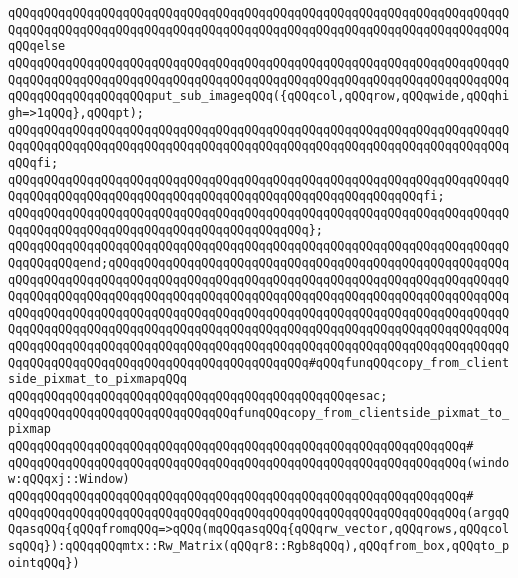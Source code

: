 \verb|qQQqqQQqqQQqqQQqqQQqqQQqqQQqqQQqqQQqqQQqqQQqqQQqqQQqqQQqqQQqqQQqqQQqqQQqqQQqqQQqqQQqqQQqqQQqqQQqqQQqqQQqqQQqqQQqqQQqqQQqqQQqqQQqqQQqqQQqqQQqqQQqelse|\newline
\verb|qQQqqQQqqQQqqQQqqQQqqQQqqQQqqQQqqQQqqQQqqQQqqQQqqQQqqQQqqQQqqQQqqQQqqQQqqQQqqQQqqQQqqQQqqQQqqQQqqQQqqQQqqQQqqQQqqQQqqQQqqQQqqQQqqQQqqQQqqQQqqQQqqQQqqQQqqQQqqQQqput_sub_imageqQQq({qQQqcol,qQQqrow,qQQqwide,qQQqhigh=>1qQQq},qQQqpt);|\newline
\verb|qQQqqQQqqQQqqQQqqQQqqQQqqQQqqQQqqQQqqQQqqQQqqQQqqQQqqQQqqQQqqQQqqQQqqQQqqQQqqQQqqQQqqQQqqQQqqQQqqQQqqQQqqQQqqQQqqQQqqQQqqQQqqQQqqQQqqQQqqQQqqQQqfi;|\newline
\verb|qQQqqQQqqQQqqQQqqQQqqQQqqQQqqQQqqQQqqQQqqQQqqQQqqQQqqQQqqQQqqQQqqQQqqQQqqQQqqQQqqQQqqQQqqQQqqQQqqQQqqQQqqQQqqQQqqQQqqQQqqQQqqQQqfi;|\newline
\verb|qQQqqQQqqQQqqQQqqQQqqQQqqQQqqQQqqQQqqQQqqQQqqQQqqQQqqQQqqQQqqQQqqQQqqQQqqQQqqQQqqQQqqQQqqQQqqQQqqQQqqQQqqQQqqQQq};|\newline
\verb|qQQqqQQqqQQqqQQqqQQqqQQqqQQqqQQqqQQqqQQqqQQqqQQqqQQqqQQqqQQqqQQqqQQqqQQqqQQqqQQqend;qQQqqQQqqQQqqQQqqQQqqQQqqQQqqQQqqQQqqQQqqQQqqQQqqQQqqQQqqQQqqQQqqQQqqQQqqQQqqQQqqQQqqQQqqQQqqQQqqQQqqQQqqQQqqQQqqQQqqQQqqQQqqQQqqQQqqQQqqQQqqQQqqQQqqQQqqQQqqQQqqQQqqQQqqQQqqQQqqQQqqQQqqQQqqQQqqQQqqQQqqQQqqQQqqQQqqQQqqQQqqQQqqQQqqQQqqQQqqQQqqQQqqQQqqQQqqQQqqQQqqQQqqQQqqQQqqQQqqQQqqQQqqQQqqQQqqQQqqQQqqQQqqQQqqQQqqQQqqQQqqQQqqQQqqQQqqQQqqQQqqQQqqQQqqQQqqQQqqQQqqQQqqQQqqQQqqQQqqQQqqQQqqQQqqQQqqQQqqQQqqQQqqQQqqQQqqQQqqQQqqQQqqQQqqQQqqQQqqQQqqQQqqQQq#qQQqfunqQQqcopy_from_clientside_pixmat_to_pixmapqQQq|\newline
\verb|qQQqqQQqqQQqqQQqqQQqqQQqqQQqqQQqqQQqqQQqqQQqqQQqesac;|\newline
\newline
\verb|qQQqqQQqqQQqqQQqqQQqqQQqqQQqqQQqfunqQQqcopy_from_clientside_pixmat_to_pixmap|\newline
\verb|qQQqqQQqqQQqqQQqqQQqqQQqqQQqqQQqqQQqqQQqqQQqqQQqqQQqqQQqqQQqqQQq#|\newline
\verb|qQQqqQQqqQQqqQQqqQQqqQQqqQQqqQQqqQQqqQQqqQQqqQQqqQQqqQQqqQQqqQQq(window:qQQqxj::Window)|\newline
\verb|qQQqqQQqqQQqqQQqqQQqqQQqqQQqqQQqqQQqqQQqqQQqqQQqqQQqqQQqqQQqqQQq#|\newline
\verb|qQQqqQQqqQQqqQQqqQQqqQQqqQQqqQQqqQQqqQQqqQQqqQQqqQQqqQQqqQQqqQQq(argqQQqasqQQq{qQQqfromqQQq=>qQQq(mqQQqasqQQq{qQQqrw_vector,qQQqrows,qQQqcolsqQQq}):qQQqqQQqmtx::Rw_Matrix(qQQqr8::Rgb8qQQq),qQQqfrom_box,qQQqto_pointqQQq})|\newline
